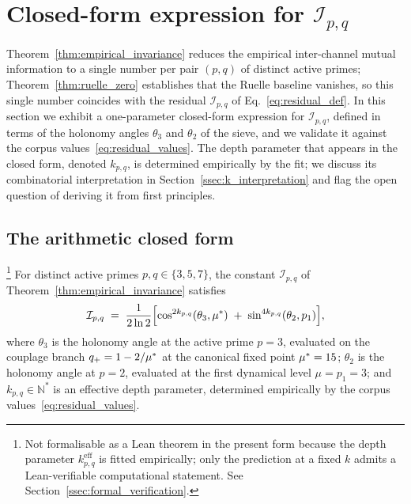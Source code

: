 \section{Closed-form expression for $\mathcal{I}_{p,q}$}
\label{sec:closed_form}

Theorem~\ref{thm:empirical_invariance} reduces the empirical
inter-channel mutual information to a single number per pair $(p, q)$
of distinct active primes; Theorem~\ref{thm:ruelle_zero} establishes
that the Ruelle baseline vanishes, so this single number coincides
with the residual
$\mathcal{I}_{p,q}$ of Eq.~\eqref{eq:residual_def}. In this section
we exhibit a one-parameter closed-form expression for
$\mathcal{I}_{p,q}$, defined in terms of the holonomy angles
$\theta_3$ and $\theta_2$ of the sieve, and we validate it against
the corpus values~\eqref{eq:residual_values}. The depth parameter
that appears in the closed form, denoted $k_{p,q}$, is determined
empirically by the fit; we discuss its combinatorial interpretation
in Section~\ref{ssec:k_interpretation} and flag the open question of
deriving it from first principles.

\subsection{The arithmetic closed form}
\label{ssec:closed_form_statement}

\begin{corollary}
\label{cor:closed_form}
\footnote{Not formalisable as a Lean theorem in the present form
because the depth parameter $k_{p,q}^{\mathrm{eff}}$ is fitted
empirically; only the prediction at a fixed $k$ admits a
Lean-verifiable computational statement. See
Section~\ref{ssec:formal_verification}.}
For distinct active primes $p, q \in \{3, 5, 7\}$, the constant
$\mathcal{I}_{p,q}$ of Theorem~\ref{thm:empirical_invariance}
satisfies
\begin{equation}
  \mathcal{I}_{p,q}
  \;=\;
  \frac{1}{2\ln 2}\Bigl[
    \cos^{2 k_{p,q}}(\theta_3, {\mu^{*}})
    \;+\;
    \sin^{4 k_{p,q}}(\theta_2, p_1)
  \Bigr],
  \label{eq:closed_form}
\end{equation}
where $\theta_3$ is the holonomy angle at the active prime $p = 3$,
evaluated on the couplage branch $q_{+} = 1 - 2/{\mu^{*}}$ at the
canonical fixed point ${\mu^{*}} = 15$; $\theta_2$ is the holonomy
angle at $p = 2$, evaluated at the first dynamical level
$\mu = p_1 = 3$; and $k_{p,q} \in \mathbb{N}^{\ast}$ is an effective
depth parameter, determined empirically by the corpus
values~\eqref{eq:residual_values}.
\end{corollary}

